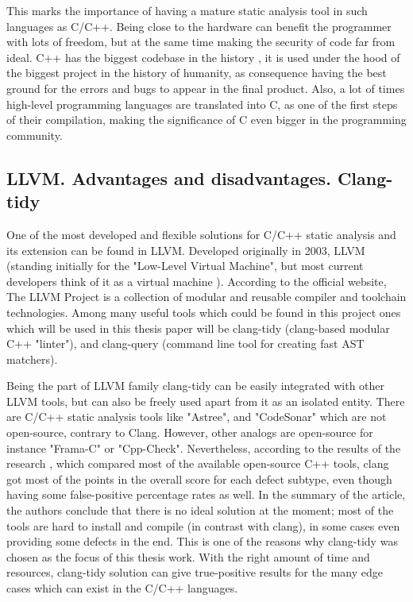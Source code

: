 This marks the importance of having a mature static analysis tool in such languages as C/C++. Being close to the hardware can benefit the programmer with lots of freedom, but at the same time making the security of code far from ideal. C++ has the biggest codebase in the history \cite{study-large-projects}, it is used under the hood of the biggest project in the history of humanity, as consequence having the best ground for the errors and bugs \cite{most-secure-pl} to appear in the final product. Also, a lot of times high-level programming languages are translated into C, as one of the first steps of their compilation, making the significance of C even bigger in the programming community. 

\subsection{LLVM. Advantages and disadvantages. Clang-tidy }

One of the most developed and flexible solutions for C/C++ static analysis and its extension can be found in LLVM. Developed originally in 2003, LLVM (standing initially for the "Low-Level Virtual Machine", but most current developers think of it as a virtual machine \cite{wiki-llvm}). According to the official website, The LLVM Project is a collection of modular and reusable compiler and toolchain technologies. Among many useful tools which could be found in this project ones which will be used in this thesis paper will be clang-tidy (clang-based modular C++ "linter"), and clang-query (command line tool for creating fast AST matchers). 

Being the part of LLVM family clang-tidy can be easily integrated with other LLVM tools, but can also be freely used apart from it as an isolated entity. There are C/C++ static analysis tools like "Astree", and "CodeSonar" which are not open-source, contrary to Clang. However, other analogs are open-source for instance "Frama-C" or "Cpp-Check". Nevertheless, according to the results of the research \cite{comparison-sat}, which compared most of the available open-source C++ tools, clang got most of the points in the overall score for each defect subtype, even though having some false-positive percentage rates as well. In the summary of the article, the authors conclude that there is no ideal solution at the moment; most of the tools are hard to install and compile (in contrast with clang), in some cases even providing some defects in the end. This is one of the reasons why clang-tidy was chosen as the focus of this thesis work. With the right amount of time and resources, clang-tidy solution can give true-positive results for the many edge cases which can exist in the C/C++ languages.


